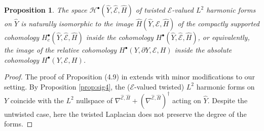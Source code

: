 \documentclass[12pt]{amsart}
\theoremstyle{plain}
\newtheorem{proposition}[theorem]{Proposition}
\theoremstyle{definition}
\theoremstyle{remark}
\begin{document}
\begin{proposition}\label{prop:sig5}
The space ${\mathcal H}^\bullet (\hat Y, \hat {\mathcal E}, \hat H)$ of twisted $\hat {\mathcal E}$-valued $L^2$ harmonic forms on $\hat Y $
is naturally isomorphic to the image ${\hat H} (\hat Y, \hat {\mathcal E}, \hat H)$ of the compactly supported cohomology $H^\bullet_c(\hat Y, \hat {\mathcal E}, \hat H)$ inside 
the cohomology $H^\bullet(\hat Y, \hat {\mathcal E}, \hat H)$, or equivalently, the image of the relative cohomology
 $H^\bullet(Y, \partial Y, {\mathcal E}, H)$ inside the absolute cohomology $H^\bullet(Y,  {\mathcal E}, H)$.
\end{proposition}

\begin{proof} 

The proof of Proposition (4.9) in \cite{APS1} extends with minor modifications to our  setting. By Proposition \ref{prop:sig4}, the (${\mathcal E}$-valued twisted) $L^2$ harmonic forms on $Y$ coincide with the $L^2$ nullspace 
 of  $\nabla^{{\hat {\mathcal E}},{\hat H}} + ({\nabla^{{\hat {\mathcal E}}, {\hat H}}})^\dag$ acting on $\hat Y$. 
Despite the untwisted case, here the twisted Laplacian does not preserve the degree of the forms.


\end{proof}
\end{document}
